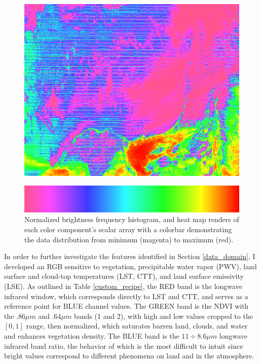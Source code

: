 \documentclass[12pt]{article}
\begin{document}
\begin{figure}[h!]
\begin{center}
{        \includegraphics[width=.24\paperwidth]{figs/rgbs/rgb_CUSTOMhistgamma_BLUE.png}
    }
    \end{center}

    \vspace{-.9em}

    \includegraphics[width=.5\linewidth]{figs/rgbs/cbar_hist.png}

    \caption{Normalized brightness frequency histogram, and heat map renders of each color component's scalar array with a colorbar demonstrating the data distribution from minimum (magenta) to maximum (red).}
    \label{custom_components}
\end{figure}

\vspace{-.8em}

In order to further investigate the features identified in Section \ref{data_domain}, I developed an RGB sensitive to vegetation, precipitable water vapor (PWV), land surface and cloud-top temperatures (LST, CTT), and land surface emissivity (LSE). As outlined in Table \ref{custom_recipe}, the RED band is the longwave infrared window, which corresponds directly to LST and CTT, and serves as a reference point for BLUE channel values. The GREEN band is the NDVI with the $.86\mu m$ and $.64\mu m$ bands (1 and 2), with high and low values cropped to the $[0,1]$ range, then normalized, which saturates barren land, clouds, and water and enhances vegetation density. The BLUE band is the $11 \div 8.6\mu m$ longwave infrared band ratio, the behavior of which is the most difficult to intuit since bright values correspond to different phenomena on land and in the atmosphere.
\end{document}
